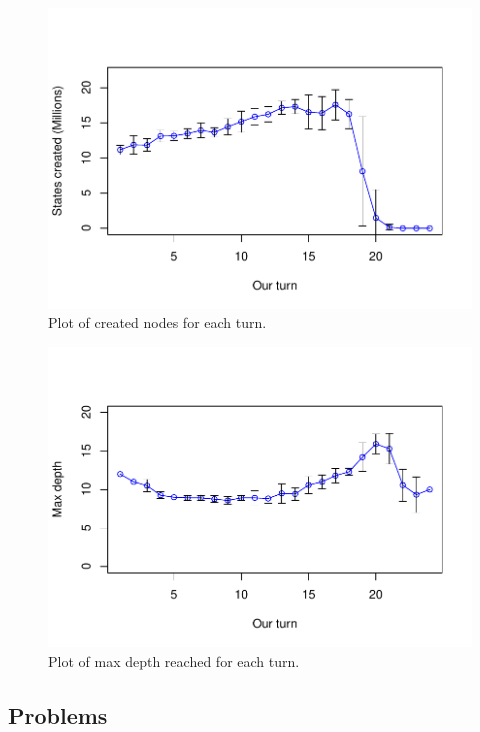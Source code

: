 \documentclass[12pt]{article}
\begin{document}
\begin{figure}
  \centering
  \includegraphics[scale=0.5]{../results/created_plot.pdf}
  \caption{Plot of created nodes for each turn.}
  \label{fig:create}
\end{figure}

\begin{figure}
  \centering
  \includegraphics[scale=0.5]{../results/depth_plot.pdf}
  \caption{Plot of max depth reached for each turn.}
  \label{fig:depth}
\end{figure}

\subsection*{Problems}
\end{document}
